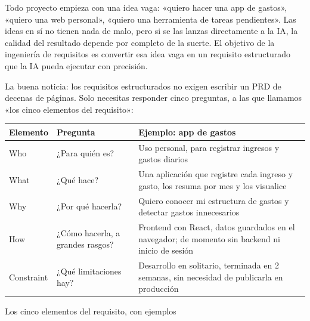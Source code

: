 


Todo proyecto empieza con una idea vaga: «quiero hacer una app de gastos», «quiero una web personal», «quiero una herramienta de tareas pendientes». Las ideas en sí no tienen nada de malo, pero si se las lanzas directamente a la IA, la calidad del resultado depende por completo de la suerte. El objetivo de la ingeniería de requisitos es convertir esa idea vaga en un requisito estructurado que la IA pueda ejecutar con precisión.

La buena noticia: los requisitos estructurados no exigen escribir un PRD de decenas de páginas. Solo necesitas responder cinco preguntas, a las que llamamos «los cinco elementos del requisito»:

\begin{center}
\begin{tabularx}{\linewidth}{|X|X|X|}
\hline
\textbf{Elemento} & \textbf{Pregunta} & \textbf{Ejemplo: app de gastos} \tabularnewline
\hline
Who & ¿Para quién es? & Uso personal, para registrar ingresos y gastos diarios \tabularnewline
What & ¿Qué hace? & Una aplicación que registre cada ingreso y gasto, los resuma por mes y los visualice \tabularnewline
Why & ¿Por qué hacerla? & Quiero conocer mi estructura de gastos y detectar gastos innecesarios \tabularnewline
How & ¿Cómo hacerla, a grandes rasgos? & Frontend con React, datos guardados en el navegador; de momento sin backend ni inicio de sesión \tabularnewline
Constraint & ¿Qué limitaciones hay? & Desarrollo en solitario, terminada en 2 semanas, sin necesidad de publicarla en producción \tabularnewline
\hline
\end{tabularx}
\end{center}

\begin{center}\small\color{gray}Los cinco elementos del requisito, con ejemplos\end{center}

